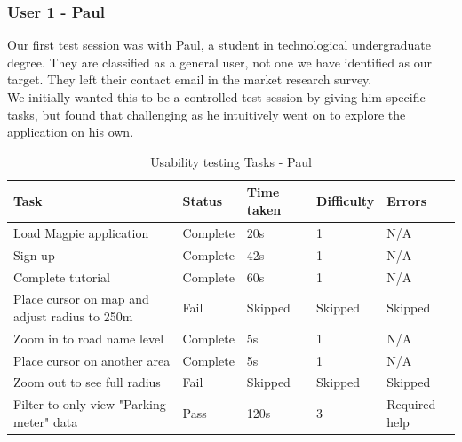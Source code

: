 \newpage
\subsubsection{User 1 - Paul}
Our first test session was with Paul, a student in technological undergraduate degree. They are classified as a general user, not one we have identified as our target. They left their contact email in the market research survey.\\
We initially wanted this to be a controlled test session by giving him specific tasks, but found that challenging as he intuitively went on to explore the application on his own.
\begin{table}[h!]
    \centering
    \caption{Usability testing Tasks - Paul}
    \begin{tabular}{|p{}|p{}|p{}|p{}|p{}|}
        \hline
        \textbf{Task}                                 & \textbf{Status} & \textbf{Time taken} & \textbf{Difficulty} & \textbf{Errors}    \\
        \hline
        Load Magpie application                       & Complete        & 20s                 & 1                   & N/A                \\
        \hline
        Sign up                                       & Complete        & 42s                 & 1                   & N/A                \\
        \hline
        Complete tutorial                             & Complete        & 60s                 & 1                   & N/A                \\
        \hline
        Place cursor on map and adjust radius to 250m & Fail            & Skipped             & Skipped             & Skipped            \\
        \hline
        Zoom in to road name level                    & Complete        & 5s                  & 1                   & N/A                \\
        \hline
        Place cursor on another area                  & Complete        & 5s                  & 1                   & N/A                \\
        \hline
        Zoom out to see full radius                   & Fail            & Skipped             & Skipped             & Skipped            \\
        \hline
        Filter to only view "Parking meter" data      & Pass            & 120s                & 3                   & Required help      \\

\end{tabular}
\end{table}
